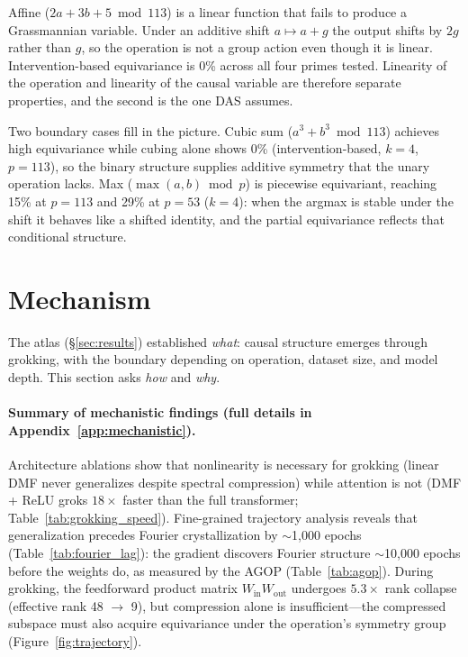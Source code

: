 \documentclass{article}
\begin{document}
Affine ($2a + 3b + 5 \bmod 113$) is a linear function that fails to produce a
Grassmannian variable. Under an additive shift $a \mapsto a + g$ the output
shifts by $2g$ rather than $g$, so the operation is not a group action even
though it is linear. Intervention-based equivariance is 0\% across all four
primes tested. Linearity of the operation and linearity of the causal variable
are therefore separate properties, and the second is the one DAS assumes.

Two boundary cases fill in the picture. Cubic sum ($a^3 + b^3 \bmod 113$)
achieves high equivariance while cubing alone shows 0\% (intervention-based,
$k{=}4$, $p{=}113$), so the binary structure supplies additive symmetry that the
unary operation lacks. Max ($\max(a,b) \bmod p$) is piecewise equivariant,
reaching 15\% at $p{=}113$ and 29\% at $p{=}53$ ($k{=}4$): when the argmax is
stable under the shift it behaves like a shifted identity, and the partial
equivariance reflects that conditional structure.

\section{Mechanism}
\label{sec:mechanism}

The atlas (\S\ref{sec:results}) established \emph{what}: causal structure
emerges through grokking, with the boundary depending on operation, dataset
size, and model depth. This section asks \emph{how} and \emph{why}.

\paragraph{Summary of mechanistic findings (full details in
Appendix~\ref{app:mechanistic}).}
Architecture ablations show that nonlinearity is necessary for grokking
(linear DMF never generalizes despite spectral compression) while attention
is not (DMF + ReLU groks $18\times$ faster than the full transformer;
Table~\ref{tab:grokking_speed}). Fine-grained trajectory analysis reveals
that generalization precedes Fourier crystallization by $\sim$1{,}000 epochs
(Table~\ref{tab:fourier_lag}): the gradient discovers Fourier structure
$\sim$10{,}000 epochs before the weights do, as measured by the AGOP
(Table~\ref{tab:agop}). During grokking, the feedforward product matrix
$W_\text{in} W_\text{out}$ undergoes $5.3\times$ rank collapse (effective
rank 48 $\to$ 9), but compression alone is insufficient---the compressed
subspace must also acquire equivariance under the operation's symmetry group
(Figure~\ref{fig:trajectory}).
\end{document}
